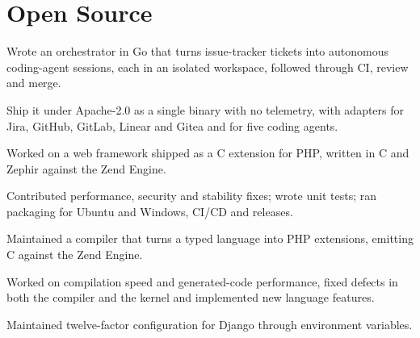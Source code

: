 
\section{Open Source}

\begin{points}
  \item Wrote an orchestrator in Go that turns issue-tracker tickets into autonomous
        coding-agent sessions, each in an isolated workspace, followed through CI,
        review and merge.
  \item Ship it under Apache-2.0 as a single binary with no telemetry, with adapters
        for Jira, GitHub, GitLab, Linear and Gitea and for five coding agents.
\end{points}

\begin{points}
  \item Worked on a web framework shipped as a C extension for PHP, written in C and
        Zephir against the Zend Engine.
  \item Contributed performance, security and stability fixes; wrote unit tests; ran
        packaging for Ubuntu and Windows, CI/CD and releases.
\end{points}

\begin{points}
  \item Maintained a compiler that turns a typed language into PHP extensions, emitting
        C against the Zend Engine.
  \item Worked on compilation speed and generated-code performance, fixed defects in
        both the compiler and the kernel and implemented new language features.
\end{points}

\begin{points}
  \item Maintained twelve-factor configuration for Django through environment variables.
\end{points}

